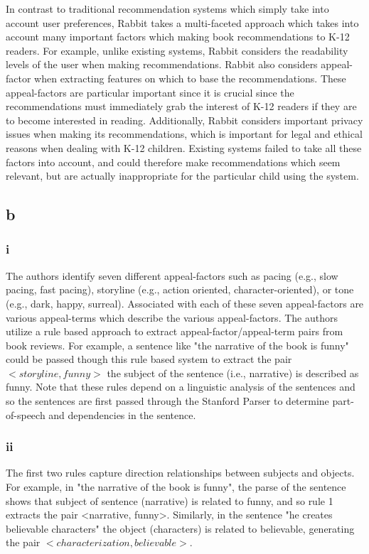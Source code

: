 \documentclass[paper=a4, fontsize=11pt]{scrartcl}
\begin{document}
In contrast to traditional recommendation systems which simply take into
account user preferences, Rabbit takes a multi-faceted approach which takes
into account many important factors which making book recommendations to K-12
readers.
For example, unlike existing systems, Rabbit considers the readability levels
of the user when making recommendations.
Rabbit also considers appeal-factor when extracting features on which to base
the recommendations.
These appeal-factors are particular important since it is crucial since the
recommendations must immediately grab the interest of K-12 readers if they are
to become interested in reading.
Additionally, Rabbit considers important privacy issues when making its
recommendations, which is important for legal and ethical reasons when dealing
with K-12 children.
Existing systems failed to take all these factors into account, and could
therefore make recommendations which seem relevant, but are actually
inappropriate for the particular child using the system.

\subsection*{b}

\subsubsection*{i}

The authors identify seven different appeal-factors such as pacing (e.g., slow
pacing, fast pacing), storyline (e.g., action oriented, character-oriented),
or tone (e.g., dark, happy, surreal).
Associated with each of these seven appeal-factors are various appeal-terms
which describe the various appeal-factors.
The authors utilize a rule based approach to extract appeal-factor/appeal-term
pairs from book reviews.
For example, a sentence like "the narrative of the book is funny" could be
passed though this rule based system to extract the pair $<storyline, funny>$
the subject of the sentence (i.e., narrative) is described as funny.
Note that these rules depend on a linguistic analysis of the sentences and so
the sentences are first passed through the Stanford Parser to determine
part-of-speech and dependencies in the sentence.

\subsubsection*{ii}

The first two rules capture direction relationships between subjects and
objects.
For example, in "the narrative of the book is funny", the parse of the
sentence shows that subject of sentence (narrative) is related to funny, and
so rule 1 extracts the pair <narrative, funny>.
Similarly, in the sentence "he creates believable characters" the object
(characters) is related to believable, generating the pair
$<characterization, believable>$.
\end{document}
